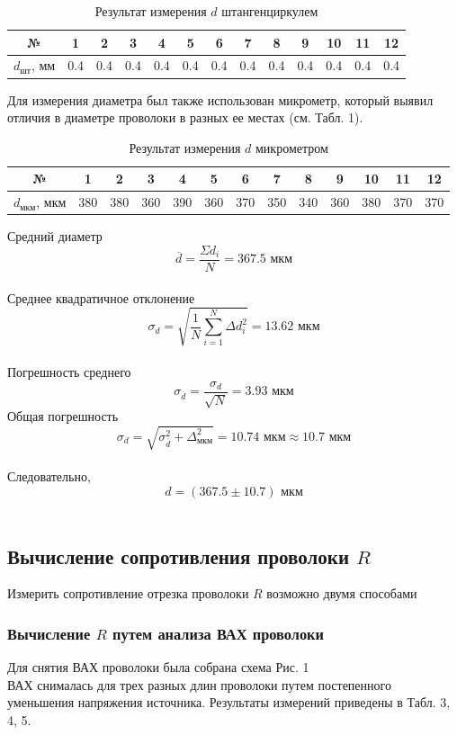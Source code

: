 \documentclass{article}
\begin{document}
	\begin{table}[H]
		\centering
		\begin{tabular}{|c|c|c|c|c|c|c|c|c|c|c|c|c|}
			\hline
			№ & 1 & 2 & 3 & 4 & 5 & 6 & 7 & 8 & 9 & 10 & 11 & 12 \\ \hline
			$d_{\text{шт}}$, мм & 0.4 & 0.4 & 0.4 & 0.4 & 0.4 & 0.4 & 0.4 & 0.4 & 0.4 & 0.4 & 0.4 & 0.4 \\ \hline
		\end{tabular}
		\caption{Результат измерения $d$ штангенциркулем}
	\end{table}
	Для измерения диаметра был также использован микрометр, который выявил отличия в диаметре проволоки в разных ее местах (см. Табл. 1).
	
	\begin{table}[H]
		
		\centering
		\begin{tabular}{|c|c|c|c|c|c|c|c|c|c|c|c|c|}
			\hline
			№ & 1 & 2 & 3 & 4 & 5 & 6 & 7 & 8 & 9 & 10 & 11 & 12 \\ \hline
			$d_{\text{мкм}}$, мкм & 380 & 380 & 360 & 390 & 360 & 370 & 350 & 340 & 360 & 380 & 370 & 370 \\ \hline
		\end{tabular}
		\caption{Результат измерения $d$ микрометром}
	\end{table}
	Средний диаметр $$\overline{d} = \frac{\Sigma d_{i}}{N} = 367.5 \text{ мкм}$$\\
	Среднее квадратичное отклонение $$\sigma_{d} = \sqrt{\frac{1}{N}\sum_{i = 1}^{N} \Delta d^{2}_{i}} = 13.62 \text{ мкм}$$\\
	Погрешность среднего $$\sigma_{\overline{d}} = \frac{\sigma_{d}}{\sqrt{N}} = 3.93 \text{ мкм}$$
	Общая погрешность $$\sigma_{d} = \sqrt{\sigma_{\overline{d}}^{2} + \Delta_{\text{мкм}}^{2}} = 10.74 \text{ мкм} \approx 10.7 \text{ мкм}$$\\
	
	Следовательно,\\
	$$d = (367.5 \pm 10.7) \text{ мкм}$$\\
	
	
	\subsection{Вычисление сопротивления проволоки $R$}
	Измерить сопротивление отрезка проволоки $R$ возможно двумя способами
	
	\subsubsection{Вычисление $R$ путем анализа ВАХ проволоки}
	Для снятия ВАХ проволоки была собрана схема Рис. 1\\
	ВАХ снималась для трех разных длин проволоки путем постепенного уменьшения напряжения источника. Результаты измерений приведены в Табл. 3, 4, 5.
	\\
	
\end{document}
